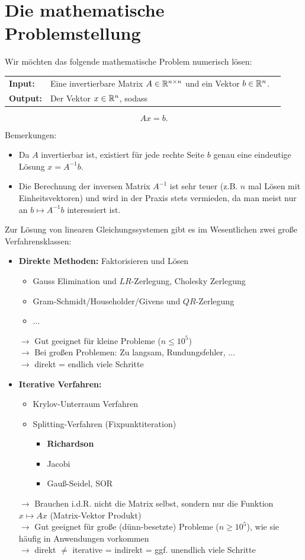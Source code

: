 
\section{Die mathematische Problemstellung}
Wir möchten das folgende mathematische Problem numerisch lösen:\\
\begin{center}
	\begin{tabular}{ll}
	\textbf{Input:} &Eine invertierbare Matrix $A\in {\mathbb{R}}^{n\times n}$ und ein Vektor $b\in {\mathbb{R}}^{n}$. ~\\
\textbf{Output:} &Der Vektor $x\in {\mathbb{R}}^{n}$, sodass
\end{tabular} 
$$Ax = b.$$
\end{center}
Bemerkungen: 
\begin{itemize}
	\item Da $A$ invertierbar ist, existiert für jede rechte Seite $b$ genau eine eindeutige Lösung $x = A^{-1}b$.
	\item Die Berechnung der inversen Matrix $A^{-1}$ ist sehr teuer (z.B. $n$ mal Lösen mit Einheitsvektoren) und wird in der Praxis stets vermieden, da man meist nur an $b \mapsto A^{-1}b$ interessiert ist.
\end{itemize}
Zur Lösung von linearen Gleichungssystemen gibt es im Wesentlichen zwei große Verfahrensklassen:
\begin{itemize}
	\item \textbf{Direkte Methoden:} Faktorisieren und Lösen
	\begin{itemize}
		\item Gauss Elimination und $LR$-Zerlegung, Cholesky Zerlegung
		\item Gram-Schmidt/Householder/Givens und $QR$-Zerlegung
		\item ...
	\end{itemize}
    $\rightarrow$ Gut geeignet für kleine Probleme ($n \leq 10^5$)\\
    $\rightarrow$ Bei großen Problemen: Zu langsam, Rundungsfehler, ...\\
    $\rightarrow$ direkt = endlich viele Schritte
	\item \textbf{Iterative Verfahren:}
	\begin{itemize}
		\item Krylov-Unterraum Verfahren
		\item Splitting-Verfahren (Fixpunktiteration)
		\begin{itemize}
			\item \textbf{Richardson}
			\item Jacobi
			\item Gauß-Seidel, SOR
		\end{itemize}
	\end{itemize}
	    $\rightarrow$ Brauchen i.d.R. nicht die Matrix selbst, sondern nur die Funktion $x \mapsto Ax$ (Matrix-Vektor Produkt)\\
$\rightarrow$ Gut geeignet für große (dünn-besetzte) Probleme ($n \geq 10^5$), wie sie häufig in Anwendungen vorkommen\\
$\rightarrow$ direkt $\neq$ iterative = indirekt = ggf. unendlich viele Schritte
\end{itemize}
